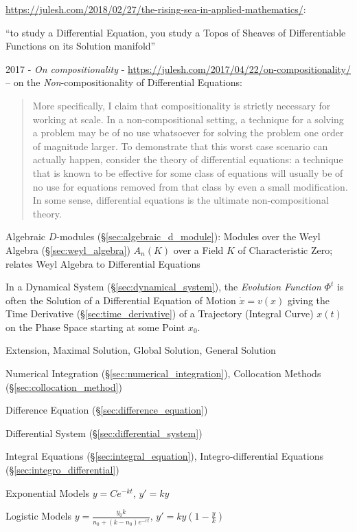 \url{https://julesh.com/2018/02/27/the-rising-sea-in-applied-mathematics/}:

``to study a Differential Equation, you study a Topos of Sheaves of
Differentiable Functions on its Solution manifold''

2017 - \emph{On compositionality} -
\url{https://julesh.com/2017/04/22/on-compositionality/} --
on the \emph{Non}-compositionality of Differential Equations:
\begin{quote}
  More specifically, I claim that compositionality is strictly necessary
  for working at scale. In a non-compositional setting, a technique for a
  solving a problem may be of no use whatsoever for solving the problem one
  order of magnitude larger. To demonstrate that this worst case scenario can
  actually happen, consider the theory of differential equations: a technique
  that is known to be effective for some class of equations will usually be of
  no use for equations removed from that class by even a small modification. In
  some sense, differential equations is the ultimate non-compositional theory.
\end{quote}

\fist Algebraic $D$-modules (\S\ref{sec:algebraic_d_module}): Modules over the
Weyl Algebra (\S\ref{sec:weyl_algebra}) $A_n(K)$ over a Field $K$ of
Characteristic Zero; relates Weyl Algebra to Differential Equations

In a Dynamical System (\S\ref{sec:dynamical_system}), the \emph{Evolution
  Function} $\Phi^t$ is often the Solution of a Differential Equation of Motion
$\dot{x} = v(x)$ giving the Time Derivative (\S\ref{sec:time_derivative}) of a
Trajectory (Integral Curve) $x(t)$ on the Phase Space starting at some Point
$x_0$.

Extension, Maximal Solution, Global Solution, General Solution

\fist Numerical Integration (\S\ref{sec:numerical_integration}), Collocation
Methods (\S\ref{sec:collocation_method})

\fist Difference Equation (\S\ref{sec:difference_equation})

\fist Differential System (\S\ref{sec:differential_system})

\fist Integral Equations (\S\ref{sec:integral_equation}), Integro-differential
Equations (\S\ref{sec:integro_differential})

Exponential Models $y = Ce^{-kt}$, $y' = ky$

Logistic Models $y = \frac{y_0 k}{n_0 + (k-n_0)e^{-rt}}$,
  $y' = ky (1 - \frac{y}{k})$

